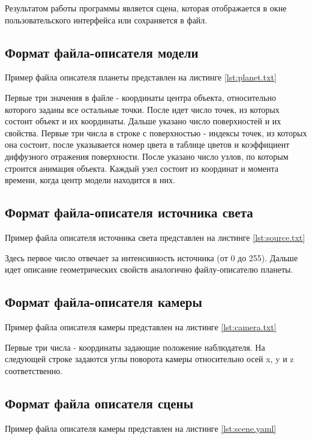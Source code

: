 Результатом работы программы является сцена, которая отображается в окне пользовательского интерфейса или сохраняется в файл.

\subsection{Формат файла-описателя модели}
Пример файла описателя планеты представлен на листинге \ref{lst:planet.txt}

Первые три значения в файле - координаты центра объекта, относительно которого заданы все остальные точки. После идет число точек, из которых состоит объект и их координаты. Дальше указано число поверхностей и их свойства. Первые три числа в строке с поверхностью - индексы точек, из которых она состоит, после указывается номер цвета в таблице цветов и коэффициент диффузного отражения поверхности. После указано число узлов, по которым строится анимация объекта. Каждый узел состоит из координат и момента времени, когда центр модели находится в них.

\subsection{Формат файла-описателя источника света}
Пример файла описателя источника света представлен на листинге \ref{lst:source.txt}


Здесь первое число отвечает за интенсивность источника (от 0 до 255). Дальше идет описание геометрических свойств аналогично файлу-описателю планеты.

\subsection{Формат файла-описателя камеры}
Пример файла описателя камеры представлен на листинге \ref{lst:camera.txt}


Первые три числа - координаты задающие положение наблюдателя. На следующей строке задаются углы поворота камеры относительно осей x, y и z соответственно.

\subsection{Формат файла описателя сцены}
Пример файла описателя камеры представлен на листинге \ref{lst:scene.yaml}

